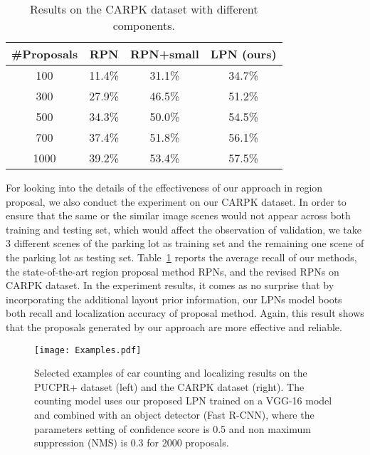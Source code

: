 \documentclass[10pt,twocolumn,letterpaper]{article}
\begin{document}
\begin{table}[h]
	\caption{Results on the CARPK dataset with different components.}
\begin{center}
\begin{tabular}{|c|c|c|c|}
\hline
\#Proposals & RPN \cite{21_ren2015faster} & RPN+small & LPN (ours) \\
\hline\hline
100  & 11.4\% & 31.1\% & 34.7\% \\
\hline
300  & 27.9\% & 46.5\% & 51.2\% \\
\hline
500  & 34.3\% & 50.0\% & 54.5\% \\
\hline
700  & 37.4\% & 51.8\% & 56.1\% \\
\hline
1000 & 39.2\% & 53.4\% & 57.5\% \\
\hline
\end{tabular}
\end{center}
\label{table:t3}
\end{table}
\vspace{-0.5 cm}

For looking into the details of the effectiveness of our approach in region proposal, we also conduct the experiment on our CARPK dataset. In order to ensure that the same or the similar image scenes would not appear across both training and testing set, which would affect the observation of validation, we take 3 different scenes of the parking lot as training set and the remaining one scene of the parking lot as testing set. Table~\ref{table:t3} reports the average recall of our methods, the state-of-the-art region proposal method RPNs, and the revised RPNs on CARPK dataset. In the experiment results, it comes as no surprise that by incorporating the additional layout prior information, our LPNs model boots both recall and localization accuracy of proposal method. Again, this result shows that the proposals generated by our approach are more effective and reliable.

\begin{figure*}[t]
\begin{center}
   \texttt{[image: Examples.pdf]}
\end{center}
   \caption{Selected examples of car counting and localizing results on the PUCPR+ dataset (left) and the CARPK dataset (right). The counting model uses our proposed LPN trained on a VGG-16 model and combined with an object detector (Fast R-CNN), where the parameters setting of confidence score is 0.5 and non maximum suppression (NMS) is 0.3 for 2000 proposals.}
\label{figure:Examples}
\end{figure*}
\end{document}
